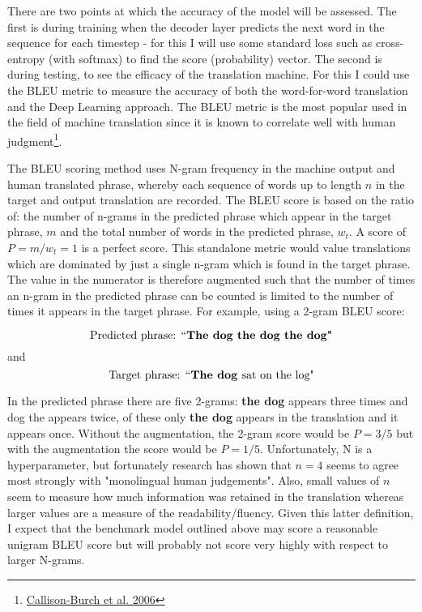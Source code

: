 \documentclass[]{article}
\begin{document}
There are two points at which the accuracy of the model will be assessed. The first is during training when the decoder layer predicts the next word in the sequence for each timestep - for this I will use some standard loss such as cross-entropy (with softmax) to find the score (probability) vector.
The second is during testing, to see the efficacy of the translation machine. For this I could use the BLEU metric to measure the accuracy of both the word-for-word translation and the Deep Learning approach. The BLEU metric is the most popular used in the field of machine translation since it is known to correlate well with human judgment\footnote{\href{https://www.aclweb.org/anthology/E/E06/E06-1032.pdf}{ Callison-Burch et al. 2006}}.

The BLEU scoring method uses N-gram frequency in the machine output and human translated phrase, whereby each sequence of words up to length $n$ in the target and output translation are recorded. The BLEU score is based on the ratio of: the number of n-grams in the predicted phrase which appear in the target phrase, $m$ and the total number of words in the predicted phrase, $w_t$. A score of $P=m/w_t=1$ is a perfect score. This standalone metric would value translations which are dominated by just a single n-gram which is found in the target phrase. The value in the numerator is therefore augmented such that the number of times an n-gram in the predicted phrase can be counted is limited to the number of times it appears in the target phrase. For example, using a 2-gram BLEU score:

\begin{equation}
\textnormal{Predicted phrase: } ``\textbf{The dog the dog the dog"}
\end{equation}
and 
\begin{equation}
\textnormal{Target phrase: } ``\textbf{The dog } \textnormal{sat on the log"}
\end{equation}



In the predicted phrase there are five 2-grams: \textbf{the dog} appears three times and dog the appears twice, of these only \textbf{the dog} appears in the translation and it appears once. Without the augmentation, the 2-gram score would be $P=3/5$ but with the augmentation the score would be $P=1/5$. Unfortunately, N is a hyperparameter, but fortunately research has shown that $n=4$ seems to agree most strongly with "monolingual human judgements". Also, small values of $n$ seem to measure how much information was retained in the translation whereas larger values are a measure of the readability/fluency. Given this latter definition, I expect that the benchmark model outlined above may score a reasonable unigram BLEU score but will probably not score very highly with respect to larger N-grams.
\end{document}
